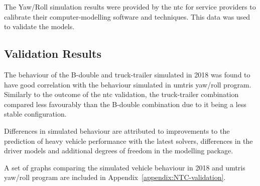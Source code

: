 The Yaw/Roll simulation results were provided by the \gls{ntc} for service providers to calibrate their computer-modelling software and techniques. This data was used to validate the models.

\subsection{Validation Results}\label{section:validation-results}

The behaviour of the B-double and truck-trailer simulated in \trucksim{} 2018 was found to have good correlation with the behaviour simulated in \glspl{umtri} yaw/roll program. Similarly to the outcome of the \gls{ntc} validation, the truck-trailer combination compared less favourably than the B-double combination due to it being a less stable configuration.

Differences in simulated behaviour are attributed to improvements to the prediction of heavy vehicle performance with the latest solvers, differences in the driver models and additional degrees of freedom in the \trucksim{} modelling package.

A set of graphs comparing the simulated vehicle behaviour in \trucksim{} 2018 and \glspl{umtri} yaw/roll program are included in Appendix~\ref{appendix:NTC-validation}.